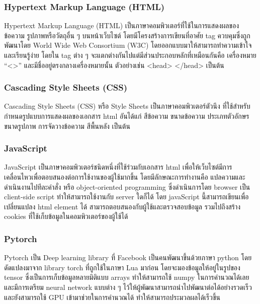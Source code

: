\documentclass[12pt,oneside,openright,a4paper]{cpe-thai-project}
\begin{document}
\subsubsection{Hypertext Markup Language (HTML)}
\par\setlength{\parindent}{5ex}
Hypertext Markup Language (HTML) เป็นภาษาคอมพิวเตอร์ที่ใช้ในการแสดงผลของข้อความ รูปภาพหรือวัตถุอื่น ๆ บนหน้าเว็บไซต์ โดยมีโครงสร้างการเขียนที่อาศัย tag ควบคุมซึ่งถูกพัฒนาโดย World Wide Web Consortium (W3C) โดยออกแบบมาให้สามารถทำความเข้าใจและเรียนรู้ง่าย โดยใน tag ต่าง ๆ จะแตกต่างกันไปแต่มีส่วนประกอบหลักที่เหมือนกันคือ เครื่องหมาย “<>” และมีชื่ออยู่ตรงกลางเครื่องหมายนั้น ตัวอย่างเช่น <head> </head> เป็นต้น

\subsubsection{Cascading Style Sheets (CSS)}
\par\setlength{\parindent}{5ex}
Cascading Style Sheets (CSS) หรือ Style Sheets เป็นภาษาคอมพิวเตอร์ตัวนึง ที่ใช้สำหรับกำหนดรูปแบบการแสดงผลของเอกสาร html อันได้แก่ สีข้อความ ขนาดข้อความ ประเภทตัวอักษร ขนาดรูปภาพ การจัดวางข้อความ สีพื้นหลัง เป็นต้น

\subsubsection{JavaScript}
\par\setlength{\parindent}{5ex}
JavaScript เป็นภาษาคอมพิวเตอร์ชนิดหนึ่งที่ใช้ร่วมกับเอกสาร html เพื่อให้เว็บไซต์มีการเคลื่อนไหวเพื่อตอบสนองต่อการใช้งานของผู้ใช้มากขึ้น โดยมีลักษณะการทำงานคือ แปลความและดำเนินงานไปทีละคำสั่ง หรือ object-oriented programming ซึ่งดำเนินการโดย browser เป็น client-side script ทำให้สามารถใช้งานกับ server ใดก็ได้ โดย javaScript นี้สามารถเขียนเพื่อเปลี่ยนแปลง html element ได้ สามารถตอบสนองกับผู้ใช้และตรวจสอบข้อมูล รวมไปถึงสร้าง cookies ที่ใช้เก็บข้อมูลในคอมพิวเตอร์ของผู้ใช้ได้

\subsubsection{Pytorch}
\par\setlength{\parindent}{5ex}
Pytorch เป็น Deep learning library ที่ Facebook เป็นคนพัฒนาขึ้นด้วยภาษา python โดยดัดแปลงมาจาก library torch ที่ถูกใช้ในภาษา Lua มาก่อน โดยจะมองข้อมูลให้อยู่ในรูปของ tensor ซึ่งเป็นการเก็บข้อมูลหลายมิติแบบ arrays ทำให้สามารถใช้ numpy ในการคำนวณได้เลย และมีการเตรียม neural network แบบต่าง ๆ ไว้ให้ผู้พัฒนาสามารถนำไปพัฒนาต่อได้อย่างรวดเร็ว และยังสามารถใช้ GPU เข้ามาช่วยในการคำนวณได้ ทำให้สามารถประมวลผลได้เร็วขึ้น
\end{document}
